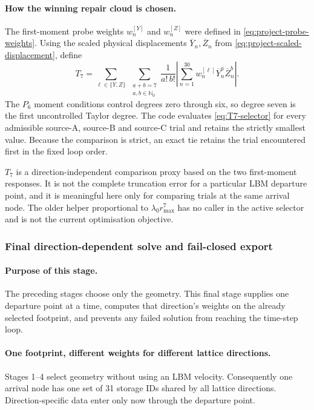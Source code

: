 \documentclass[11pt,a4paper]{article}
\begin{document}
\paragraph{How the winning repair cloud is chosen.}
The first-moment probe weights $w_n^{[Y]}$ and $w_n^{[Z]}$ were defined in
\eqref{eq:project-probe-weights}. Using the scaled physical displacements
$\overline Y_n,\overline Z_n$ from \eqref{eq:project-scaled-displacement}, define
\begin{equation}
 T_7=
 \sum_{\ell\in\{Y,Z\}}\ \sum_{\substack{a+b=7\\a,b\in\mathbb N_0}}
 \frac{1}{a!\,b!}
 \left|
 \sum_{n=1}^{30}
 w_n^{[\ell]}\overline Y_n^a\overline Z_n^b
 \right|.
\label{eq:T7-selector}
\end{equation}
The $P_6$ moment conditions control degrees zero through six, so degree seven is the first
uncontrolled Taylor degree. The code evaluates \eqref{eq:T7-selector} for every
admissible source-A, source-B and source-C trial and retains the strictly smallest value.
Because the comparison is strict, an exact tie retains the trial encountered first in the
fixed loop order.

$T_7$ is a direction-independent comparison proxy based on the two first-moment
responses. It is not the complete truncation error for a particular LBM departure point,
and it is meaningful here only for comparing trials at the same arrival node. The older
helper proportional to $\lambda_0r_{\max}^7$ has no caller in the active selector and is
not the current optimisation objective.

\subsubsection{Final direction-dependent solve and fail-closed export}
\label{sec:project-final-solve}

\paragraph{Purpose of this stage.}
The preceding stages choose only the geometry. This final stage supplies one departure
point at a time, computes that direction's weights on the already selected footprint,
and prevents any failed solution from reaching the time-step loop.

\paragraph{One footprint, different weights for different lattice directions.}
Stages 1--4 select geometry without using an LBM velocity. Consequently one arrival node
has one set of 31 storage IDs shared by all lattice directions. Direction-specific data
enter only now through the departure point.
\end{document}
